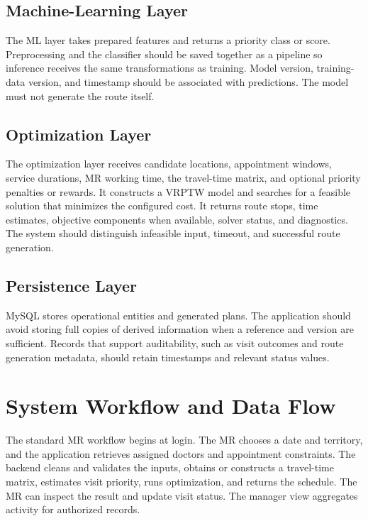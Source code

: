 \documentclass[12pt,a4paper,oneside]{report}
\begin{document}
\subsection{Machine-Learning Layer}
The ML layer takes prepared features and returns a priority class or score. Preprocessing and the classifier should be saved together as a pipeline so inference receives the same transformations as training. Model version, training-data version, and timestamp should be associated with predictions. The model must not generate the route itself.

\subsection{Optimization Layer}
The optimization layer receives candidate locations, appointment windows, service durations, MR working time, the travel-time matrix, and optional priority penalties or rewards. It constructs a VRPTW model and searches for a feasible solution that minimizes the configured cost. It returns route stops, time estimates, objective components when available, solver status, and diagnostics. The system should distinguish infeasible input, timeout, and successful route generation.

\subsection{Persistence Layer}
MySQL stores operational entities and generated plans. The application should avoid storing full copies of derived information when a reference and version are sufficient. Records that support auditability, such as visit outcomes and route generation metadata, should retain timestamps and relevant status values.

\section{System Workflow and Data Flow}
The standard MR workflow begins at login. The MR chooses a date and territory, and the application retrieves assigned doctors and appointment constraints. The backend cleans and validates the inputs, obtains or constructs a travel-time matrix, estimates visit priority, runs optimization, and returns the schedule. The MR can inspect the result and update visit status. The manager view aggregates activity for authorized records.
\end{document}
